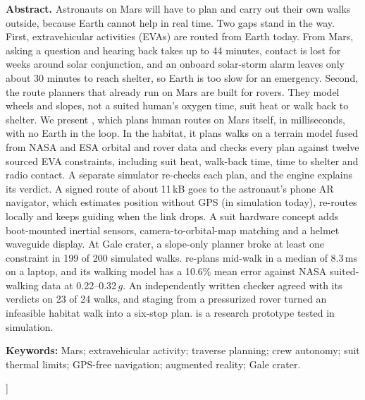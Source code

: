 \documentclass[10pt,twocolumn]{article}
\begin{document}
{\vspace{6pt}
\noindent\begin{minipage}{\textwidth}
\setlength{\parindent}{0pt}
\begin{center}\begin{minipage}{0.92\textwidth}
\small
\textbf{Abstract.} Astronauts on Mars will have to plan and carry out their own walks outside, because Earth cannot help in real time. Two gaps stand in the way. First, extravehicular activities (EVAs) are routed from Earth today. From Mars, asking a question and hearing back takes up to 44 minutes, contact is lost for weeks around solar conjunction, and an onboard solar-storm alarm leaves only about 30 minutes to reach shelter, so Earth is too slow for an emergency. Second, the route planners that already run on Mars are built for rovers. They model wheels and slopes, not a suited human's oxygen time, suit heat or walk back to shelter. We present \Marswalk, which plans human routes on Mars itself, in milliseconds, with no Earth in the loop. In the habitat, it plans walks on a terrain model fused from NASA and ESA orbital and rover data and checks every plan against twelve sourced EVA constraints, including suit heat, walk-back time, time to shelter and radio contact. A separate simulator re-checks each plan, and the engine explains its verdict. A signed route of about 11\,kB goes to the astronaut's phone AR navigator, which estimates position without GPS (in simulation today), re-routes locally and keeps guiding when the link drops. A suit hardware concept adds boot-mounted inertial sensors, camera-to-orbital-map matching and a helmet waveguide display. At Gale crater, a slope-only planner broke at least one constraint in 199 of 200 simulated walks. \Marswalk re-plans mid-walk in a median of 8.3\,ms on a laptop, and its walking model has a 10.6\% mean error against NASA suited-walking data at 0.22--0.32\,$g$. An independently written checker agreed with its verdicts on 23 of 24 walks, and staging from a pressurized rover turned an infeasible habitat walk into a six-stop plan. \Marswalk is a research prototype tested in simulation.

\vspace{5pt}
\textbf{Keywords:} Mars; extravehicular activity; traverse planning; crew autonomy; suit thermal limits; GPS-free navigation; augmented reality; Gale crater.
\end{minipage}\end{center}
\end{minipage}
\vspace{4pt}
\vspace{10pt}
}]
\end{document}

